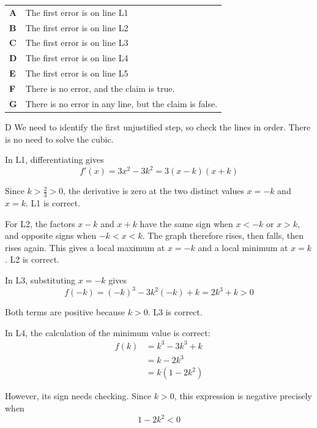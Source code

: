 \documentclass[11pt,a4paper]{article}
\begin{document}
\begin{enumerate}[label=\textbf{\arabic*.},leftmargin=*,itemsep=0pt,start=16]
\par\vspace*{12pt}
\begin{tabularx}{\linewidth}{@{}>{\bfseries}l Y@{}}
A &
The first error is on line L1
\\[0.8em]
B &
The first error is on line L2
\\[0.8em]
C &
The first error is on line L3
\\[0.8em]
D &
The first error is on line L4
\\[0.8em]
E &
The first error is on line L5
\\[0.8em]
F &
There is no error, and the claim is true.
\\[0.8em]
G &
There is no error in any line, but the claim is false.
\\
\end{tabularx}

\begin{djsSolution}{D}
We need to identify the first unjustified step, so check the lines in order. There is no need to solve the cubic.

In L1, differentiating gives
\[
f'(x)=3x^2-3k^2=3(x-k)(x+k)
\]

Since $k>\frac23>0$, the derivative is zero at the two distinct values $x=-k$ and $x=k$. L1 is correct.

For L2, the factors $x-k$ and $x+k$ have the same sign when $x<-k$ or $x>k$, and opposite signs when $-k<x<k$. The graph therefore rises, then falls, then rises again. This gives a local maximum at $x=-k$ and a local minimum at $x=k$. L2 is correct.

In L3, substituting $x=-k$ gives
\[
f(-k)=(-k)^3-3k^2(-k)+k=2k^3+k>0
\]

Both terms are positive because $k>0$. L3 is correct.

In L4, the calculation of the minimum value is correct:
\[
\begin{aligned}
f(k)&=k^3-3k^3+k\\[5pt]
&=k-2k^3\\[5pt]
&=k(1-2k^2)
\end{aligned}
\]

However, its sign needs checking. Since $k>0$, this expression is negative precisely when
\[
1-2k^2<0
\]


\end{djsSolution}
\end{enumerate}
\end{document}
